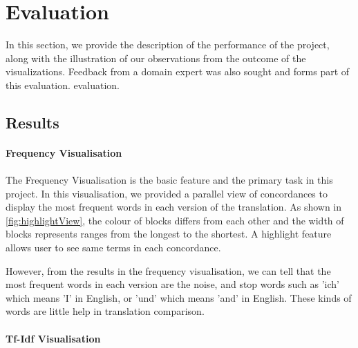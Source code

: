 \clearpage
\section{Evaluation}
In this section, we provide the description of the performance of the project, along with the illustration of our observations from the outcome of the visualizations. Feedback from a domain expert was also sought and forms part of this evaluation. evaluation.

\subsection{Results}

\paragraph{Frequency Visualisation}
\paragraph[]{}
The Frequency Visualisation is the basic feature and the primary task in this project. In this visualisation, we provided a parallel view of concordances to display the most frequent words in each version of the translation. As shown in \ref{fig:highlightView}, the colour of blocks differs from each other and the width of blocks represents ranges from the longest to the shortest. A highlight feature allows user to see same terms in each concordance.


However, from the results in the frequency visualisation, we can tell that the most frequent words in each version are the noise, and stop words such as 'ich' which means 'I' in English, or 'und' which means 'and' in English. These kinds of words are little help in translation comparison.


\paragraph{Tf-Idf Visualisation}
